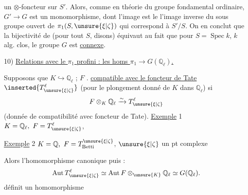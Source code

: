 un  $\otimes$-foncteur  sur $S'$. Alors,
comme en théorie du groupe fondamental ordinaire,
$G'\longrightarrow G$ est un monomorphisme, dont
l'image est le  l'image inverse  du sous
groupe ouvert de $\pi_1(S,\unsure{\xi|\zeta})$ qui correspond à $S'/S$.
On en conclut que la bijectivité de \unsure{$(*)$}
(pour tout $S$, disons) équivaut au fait que
pour $S=\operatorname{Spec}k$, $k$ alg. clos, le  groupe $G$
est \uline{connexe}.

10) \uline{Relations avec le $\pi_1$ profini : les homs $\pi_1\longrightarrow G(\mathbb{Q}_\ell)$.}

Supposons  que $K\hookrightarrow\mathbb{Q}_\ell$ ;
 $F$
.
\uline{compatible avec
le foncteur de Tate} $\inserted{T^\ell_{\unsure{\xi|\zeta}}}$
(pour le plongement donné
de $K$ dans $\mathbb{Q}_\ell$) si
\[
 F\otimes_K\mathbb{Q}_\ell \xrightarrow{\sim}T^\ell_{\unsure{\xi|\zeta}}
\]
(donnée de compatibilité avec foncteur de
Tate). \uline{Exemple} 1 \quad $K=\mathbb{Q}_\ell,\ F=T^\ell_{\unsure{\xi|\zeta}}$,

\uline{Exemple} 2 \quad $K=\mathbb{Q},\ F=T^{\unsure{\xi|\zeta}}_{\mathrm{Betti}}$,
$\unsure{\xi|\zeta}$ un pt complexe

Alors  l'homomorphisme canonique
puis :
\[
\operatorname{Aut}T^\ell_{\unsure{\xi|\zeta}}
 \simeq \operatorname{Aut}F\otimes_{\unsure{K}}\mathbb{Q}_\ell
 \simeq G(\mathbb{Q}_\ell).
\]
définit un homomorphisme
